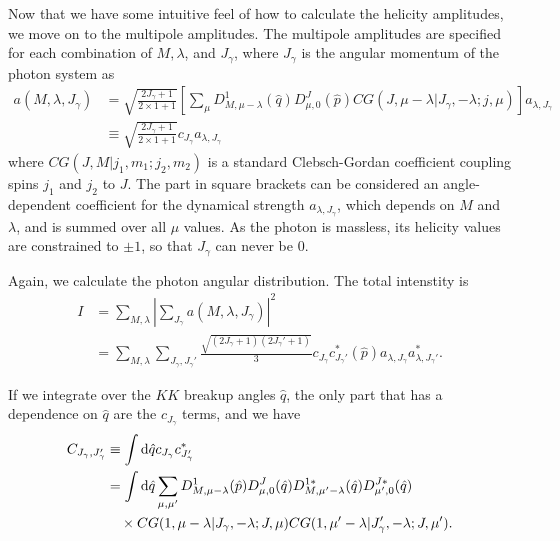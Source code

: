 \documentclass[11pt]{article}
\begin{document}
Now that we have some intuitive feel of how to calculate the helicity
amplitudes, we move on to the multipole amplitudes. The multipole
amplitudes are specified for each combination of $M, \lambda$, and
$J_{\gamma}$, where $J_{\gamma}$ is the angular momentum of the photon
system as
\begin{align}
  a(M,\lambda,J_{\gamma}) &= \sqrt{\frac{2 J_{\gamma}+1}{2 \times
      1+1}}
  \left[
    \sum_{\mu} D^{1}_{M,\mu-\lambda} (\hat{q}) D^{J}_{\mu,0} (\hat{p})
    CG(J,\mu-\lambda | J_{\gamma}, - \lambda; j,\mu)
    \right]
  a_{\lambda,J_{\gamma}} \\
  &\equiv \sqrt{\frac{2 J_{\gamma}+1}{2 \times
      1+1}} c_{J_{\gamma}} a_{\lambda,J_{\gamma}}
\end{align}
where $CG(J,M|j_{1},m_{1};j_{2},m_{2})$ is a standard Clebsch-Gordan
coefficient coupling spins $j_{1}$ and $j_{2}$ to $J$. The part in
square brackets can be considered an angle-dependent coefficient for
the dynamical strength $a_{\lambda, J_{\gamma}}$, which depends on $M$ and
$\lambda$, and is summed over all $\mu$ values. As the photon is
massless, its helicity values are constrained to $\pm 1$, so that
$J_{\gamma}$ can never be $0$.

Again, we calculate the photon angular distribution. The total
intenstity is
\begin{align}
  I &= \sum_{M, \lambda} \left| \sum_{J_{\gamma}} a(M, \lambda, J_{\gamma})
  \right|^{2} \\
  &= \sum_{M, \lambda} \sum_{J_{\gamma}, J_{\gamma}'}\frac{\sqrt{(2J_{\gamma}+1) (2
      J_{\gamma}'+1)}}{3}
    c_{J_{\gamma}} c_{J_{\gamma}'}^{\ast}
  (\hat{p}) a_{\lambda, J_{\gamma}} a_{\lambda, J_{\gamma}'}^{\ast}.
\end{align}

If we integrate over the $KK$ breakup angles $\hat{q}$, the only part
that has a dependence on $\hat{q}$ are the $c_{J_{\gamma}}$ terms,
and we have
\begin{align}
C_{J_{\gamma},J_{\gamma}'} &\equiv \int \mathrm{d} \hat{q} c_{J_{\gamma}}
c_{J_{\gamma}'}^{\ast} \\
&= \int
\mathrm{d} \hat{q} \sum_{\mu, \mu'} D^{1}_{M,\mu-\lambda}(\hat{p})
D^{J}_{\mu,0}(\hat{q}) D^{1 \ast}_{M,\mu'-\lambda}(\hat{q}) D^{J
  \ast}_{\mu',0}(\hat{q}) \notag \\
& \ \ \  \times CG(1,\mu-\lambda|J_{\gamma},-\lambda;J,\mu)
CG(1,\mu'-\lambda|J_{\gamma}',-\lambda;J,\mu').
\end{align}
\end{document}
